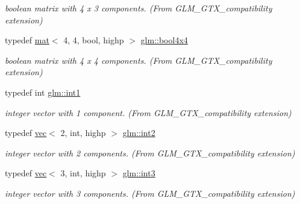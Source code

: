 \begin{DoxyCompactItemize}
\begin{DoxyCompactList}\small\item\em boolean matrix with 4 x 3 components. (From G\+L\+M\+\_\+\+G\+T\+X\+\_\+compatibility extension) \end{DoxyCompactList}\item 
\mbox{\label{group__gtx__compatibility_ga568a1c97a6c6f7253334ee5933a6cb77}} 
typedef \hyperlink{structglm_1_1mat}{mat}$<$ 4, 4, bool, highp $>$ \hyperlink{group__gtx__compatibility_ga568a1c97a6c6f7253334ee5933a6cb77}{glm\+::bool4x4}
\begin{DoxyCompactList}\small\item\em boolean matrix with 4 x 4 components. (From G\+L\+M\+\_\+\+G\+T\+X\+\_\+compatibility extension) \end{DoxyCompactList}\item 
\mbox{\label{group__gtx__compatibility_gaba41d7803e4b24c17656d74377b88286}} 
typedef int \hyperlink{group__gtx__compatibility_gaba41d7803e4b24c17656d74377b88286}{glm\+::int1}
\begin{DoxyCompactList}\small\item\em integer vector with 1 component. (From G\+L\+M\+\_\+\+G\+T\+X\+\_\+compatibility extension) \end{DoxyCompactList}\item 
\mbox{\label{group__gtx__compatibility_ga3a3a6007d7619dee4f6c425fe7ac24eb}} 
typedef \hyperlink{structglm_1_1vec}{vec}$<$ 2, int, highp $>$ \hyperlink{group__gtx__compatibility_ga3a3a6007d7619dee4f6c425fe7ac24eb}{glm\+::int2}
\begin{DoxyCompactList}\small\item\em integer vector with 2 components. (From G\+L\+M\+\_\+\+G\+T\+X\+\_\+compatibility extension) \end{DoxyCompactList}\item 
\mbox{\label{group__gtx__compatibility_ga90dda63e632aac169a8796ac06ff9de2}} 
typedef \hyperlink{structglm_1_1vec}{vec}$<$ 3, int, highp $>$ \hyperlink{group__gtx__compatibility_ga90dda63e632aac169a8796ac06ff9de2}{glm\+::int3}
\begin{DoxyCompactList}\small\item\em integer vector with 3 components. (From G\+L\+M\+\_\+\+G\+T\+X\+\_\+compatibility extension) \end{DoxyCompactList}\item 

\end{DoxyCompactItemize}
